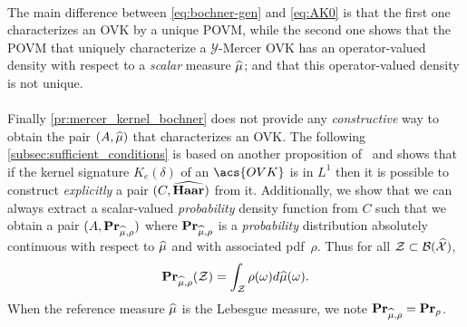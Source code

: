 \paragraph{}
The main difference between \cref{eq:bochner-gen} and
\cref{eq:AK0} is that the first one characterizes an \acs{OVK}
by a unique \acf{POVM}, while the second one shows that the \acs{POVM} that
uniquely characterize a $\mathcal{Y}$-Mercer \acs{OVK} has an operator-valued
density with respect to a \emph{scalar} measure $\widehat{\mu}$; and that this
operator-valued density is not unique.
\paragraph{}
Finally \cref{pr:mercer_kernel_bochner} does not provide any
\emph{constructive} way to obtain the pair $(A,\widehat{\mu})$ that characterizes
an \acs{OVK}. The following \cref{subsec:sufficient_conditions} is based on
another proposition of~\citeauthor{carmeli2006vector} and shows that if the
kernel signature $K_e(\delta)$ of an $\acs{OVK}$ is in $L^1$ then it is
possible to construct \emph{explicitly} a pair $(C,\widehat{\mathbf{Haar}})$ from it.
Additionally, we show that we can always extract a scalar-valued
\emph{probability} density function from $C$ such that we obtain a pair
$(A,{\mathbf{{Pr}}}_{\widehat{\mu},\rho})$ where ${\mathbf{{Pr}}}_{\widehat{\mu},\rho}$ is
a \emph{probability} distribution absolutely continuous with respect to
$\widehat{\mu}$ and with associated \ac{pdf}~$\rho$. Thus for all
$\mathcal{Z}\subset\mathcal{B}(\widehat{\mathcal{X}})$,
\begin{dmath*}
    \probability_{\dual{\mu},\rho}(\mathcal{Z})=\int_{\mathcal{Z}}
    \rho(\omega)d\dual{\mu}(\omega).
\end{dmath*}
When the reference measure $\widehat{\mu}$ is the Lebesgue measure, we note
${\mathbf{{Pr}}}_{\widehat{\mu},\rho}={\mathbf{{Pr}}}_\rho$.

